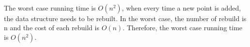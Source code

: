 \begin{problem}{3} ~\\
The worst case running time is $O(n^2)$, when every time a new point is added, the data structure needs to be rebuilt. In the worst case, the number of rebuild is n and the cost of each rebuild is $O(n)$. Therefore, the worst case running time is $O(n^2)$.
\end{problem}